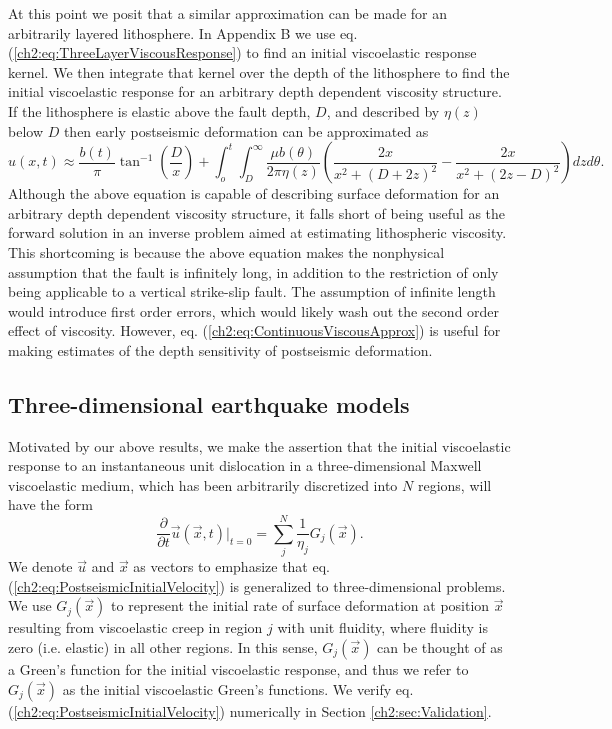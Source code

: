 At this point we posit that a similar approximation can be made for an
arbitrarily layered lithosphere. In Appendix B we use
eq. (\ref{ch2:eq:ThreeLayerViscousResponse}) to find an initial viscoelastic
response kernel.  We then integrate that kernel over the depth of the
lithosphere to find the initial viscoelastic response for an arbitrary
depth dependent viscosity structure.  If the lithosphere is elastic
above the fault depth, $D$, and described by $\eta(z)$ below $D$ then
early postseismic deformation can be approximated as
\begin{equation}\label{ch2:eq:ContinuousViscousApprox}
u(x,t) \approx 
\frac{b(t)}{\pi}\tan^{-1}(\frac{D}{x}) + 
\int_o^t\int_D^\infty \frac{\mu b(\theta)}{2\pi\eta(z)}
                      \left(\frac{2x}{x^2 + \left(D + 2z\right)^2} - 
                      \frac{2x}{x^2 + \left(2z - D\right)^2}\right)
                      dz d\theta.
\end{equation}
Although the above equation is capable of describing surface
deformation for an arbitrary depth dependent viscosity structure, it
falls short of being useful as the forward solution in an inverse
problem aimed at estimating lithospheric viscosity.  This shortcoming
is because the above equation makes the nonphysical assumption that the
fault is infinitely long, in addition to the restriction of only being
applicable to a vertical strike-slip fault.  The assumption of
infinite length would introduce first order errors, which would likely
wash out the second order effect of viscosity. However,
eq. (\ref{ch2:eq:ContinuousViscousApprox}) is useful for making estimates of
the depth sensitivity of postseismic deformation.

\subsection{Three-dimensional earthquake models}\label{ch2:sec:3DModel}
Motivated by our above results, we make the assertion that the initial
viscoelastic response to an instantaneous unit dislocation in a
three-dimensional Maxwell viscoelastic medium, which has been
arbitrarily discretized into $N$ regions, will have the form
\begin{equation}\label{ch2:eq:PostseismicInitialVelocity}
\frac{\partial}{\partial t}\vec{u}(\vec{x},t)\big|_{t=0} = 
\sum_j^N\frac{1}{\eta_j}G_j(\vec{x}).
\end{equation}
We denote $\vec{u}$ and $\vec{x}$ as vectors to emphasize that eq.
(\ref{ch2:eq:PostseismicInitialVelocity}) is generalized to three-dimensional
problems.  We use $G_j(\vec{x})$ to represent the initial rate of
surface deformation at position $\vec{x}$ resulting from viscoelastic
creep in region $j$ with unit fluidity, where fluidity is zero (i.e.
elastic) in all other regions.  In this sense, $G_j(\vec{x})$ can be
thought of as a Green's function for the initial viscoelastic
response, and thus we refer to $G_j(\vec{x})$ as the initial
viscoelastic Green's functions.  We verify eq.
(\ref{ch2:eq:PostseismicInitialVelocity}) numerically in Section
\ref{ch2:sec:Validation}.

